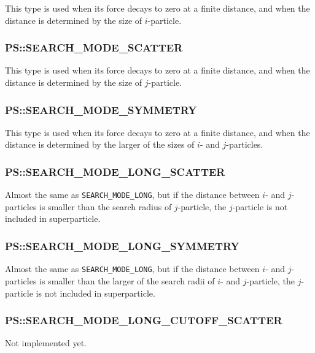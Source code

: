 This type is used when its force decays to zero at a finite distance,
and when the distance is determined by the size of $i$-particle.

\subsubsection{PS::SEARCH\_MODE\_SCATTER}

This type is used when its force decays to zero at a finite distance,
and when the distance is determined by the size of $j$-particle.

\subsubsection{PS::SEARCH\_MODE\_SYMMETRY}

This type is used when its force decays to zero at a finite distance,
and when the distance is determined by the larger of the sizes of $i$-
and $j$-particles.

\subsubsection{PS::SEARCH\_MODE\_LONG\_SCATTER}

Almost the same as {\tt SEARCH\_MODE\_LONG}, but if the distance
between $i$- and $j$-particles is smaller than the search radius of
$j$-particle, the $j$-particle is not included in superparticle.


\subsubsection{PS::SEARCH\_MODE\_LONG\_SYMMETRY}

Almost the same as {\tt SEARCH\_MODE\_LONG}, but if the distance
between $i$- and $j$-particles is smaller than the larger of the search radii of
$i$- and $j$-particle, the $j$-particle is not included in superparticle.


\subsubsection{PS::SEARCH\_MODE\_LONG\_CUTOFF\_SCATTER}

Not implemented yet.

